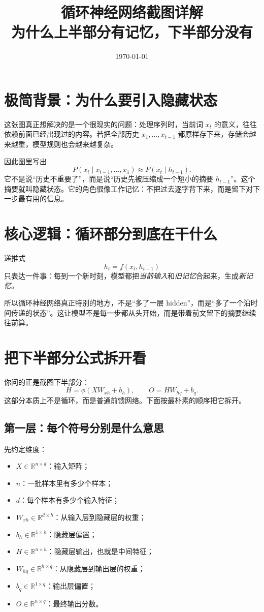 \documentclass[12pt,a4paper]{ctexart}
\title{循环神经网络截图详解\\
\large 为什么上半部分有记忆，下半部分没有}
\author{}
\date{\today}
\begin{document}
\maketitle
\tableofcontents

\section{极简背景：为什么要引入隐藏状态}

这张图真正想解决的是一个很现实的问题：处理序列时，当前词 \(x_t\) 的意义，往往依赖前面已经出现过的内容。若把全部历史 \(x_1,\ldots,x_{t-1}\) 都原样存下来，存储会越来越重，模型规则也会越来越复杂。

因此图里写出
\[
P(x_t \mid x_{t-1}, \ldots, x_1) \approx P(x_t \mid h_{t-1}).
\]
它不是说“历史不重要了”，而是说“历史先被压缩成一个短小的摘要 \(h_{t-1}\)”。这个摘要就叫隐藏状态。它的角色很像工作记忆：不把过去逐字背下来，而是留下对下一步最有用的信息。

\section{核心逻辑：循环部分到底在干什么}

递推式
\[
h_t = f(x_t, h_{t-1})
\]
只表达一件事：每到一个新时刻，模型都把\emph{当前输入}和\emph{旧记忆}合起来，生成\emph{新记忆}。

所以循环神经网络真正特别的地方，不是“多了一层 hidden”，而是“多了一个沿时间传递的状态”。这让模型不是每一步都从头开始，而是带着前文留下的摘要继续往前算。

\section{把下半部分公式拆开看}

你问的正是截图下半部分：
\[
H = \phi(XW_{xh} + b_h), \qquad O = HW_{hq} + b_q.
\]
这部分本质上不是循环，而是普通前馈网络。下面按最朴素的顺序把它拆开。

\subsection{第一层：每个符号分别是什么意思}

先约定维度：
\begin{itemize}
  \item \(X \in \mathbb{R}^{n \times d}\)：输入矩阵；
  \item \(n\)：一批样本里有多少个样本；
  \item \(d\)：每个样本有多少个输入特征；
  \item \(W_{xh} \in \mathbb{R}^{d \times h}\)：从输入层到隐藏层的权重；
  \item \(b_h \in \mathbb{R}^{1 \times h}\)：隐藏层偏置；
  \item \(H \in \mathbb{R}^{n \times h}\)：隐藏层输出，也就是中间特征；
  \item \(W_{hq} \in \mathbb{R}^{h \times q}\)：从隐藏层到输出层的权重；
  \item \(b_q \in \mathbb{R}^{1 \times q}\)：输出层偏置；
  \item \(O \in \mathbb{R}^{n \times q}\)：最终输出分数。
\end{itemize}
\end{document}

